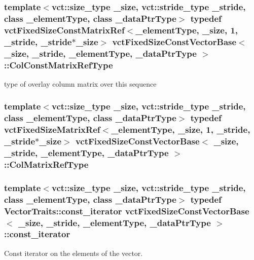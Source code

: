 \subsubsection[{Col\+Const\+Matrix\+Ref\+Type}]{\setlength{\rightskip}{0pt plus 5cm}template$<$vct\+::size\+\_\+type \+\_\+size, vct\+::stride\+\_\+type \+\_\+stride, class \+\_\+element\+Type, class \+\_\+data\+Ptr\+Type$>$ typedef {\bf vct\+Fixed\+Size\+Const\+Matrix\+Ref}$<$\+\_\+element\+Type, \+\_\+size, 1, \+\_\+stride, \+\_\+stride$\ast$\+\_\+size$>$ {\bf vct\+Fixed\+Size\+Const\+Vector\+Base}$<$ \+\_\+size, \+\_\+stride, \+\_\+element\+Type, \+\_\+data\+Ptr\+Type $>$\+::{\bf Col\+Const\+Matrix\+Ref\+Type}}\label{classvct_fixed_size_const_vector_base_a7dd213f3b90969b8c89fd0766cf0a70e}
type of overlay column matrix over this sequence \hypertarget{classvct_fixed_size_const_vector_base_ac2454662f16abd75fdef4ce8d2a00a48}{}
\subsubsection[{Col\+Matrix\+Ref\+Type}]{\setlength{\rightskip}{0pt plus 5cm}template$<$vct\+::size\+\_\+type \+\_\+size, vct\+::stride\+\_\+type \+\_\+stride, class \+\_\+element\+Type, class \+\_\+data\+Ptr\+Type$>$ typedef {\bf vct\+Fixed\+Size\+Matrix\+Ref}$<$\+\_\+element\+Type, \+\_\+size, 1, \+\_\+stride, \+\_\+stride$\ast$\+\_\+size$>$ {\bf vct\+Fixed\+Size\+Const\+Vector\+Base}$<$ \+\_\+size, \+\_\+stride, \+\_\+element\+Type, \+\_\+data\+Ptr\+Type $>$\+::{\bf Col\+Matrix\+Ref\+Type}}\label{classvct_fixed_size_const_vector_base_ac2454662f16abd75fdef4ce8d2a00a48}
\hypertarget{classvct_fixed_size_const_vector_base_abc547e0542bb6f7d92876a56c7ea5cdc}{}
\subsubsection[{const\+\_\+iterator}]{\setlength{\rightskip}{0pt plus 5cm}template$<$vct\+::size\+\_\+type \+\_\+size, vct\+::stride\+\_\+type \+\_\+stride, class \+\_\+element\+Type, class \+\_\+data\+Ptr\+Type$>$ typedef {\bf Vector\+Traits\+::const\+\_\+iterator} {\bf vct\+Fixed\+Size\+Const\+Vector\+Base}$<$ \+\_\+size, \+\_\+stride, \+\_\+element\+Type, \+\_\+data\+Ptr\+Type $>$\+::{\bf const\+\_\+iterator}}\label{classvct_fixed_size_const_vector_base_abc547e0542bb6f7d92876a56c7ea5cdc}
Const iterator on the elements of the vector. \hypertarget{classvct_fixed_size_const_vector_base_acd0a5fe64ff3551c45cebfb2ba81cf10}{}
